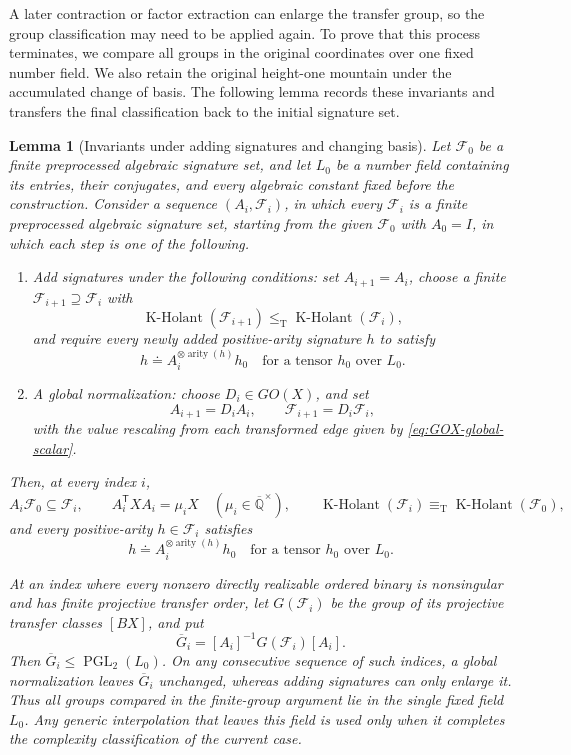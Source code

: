 \documentclass[11pt,letterpaper,onecolumn]{article}
\theoremstyle{plain}
\newtheorem{lemma}[lemma]{Lemma}
\theoremstyle{definition}
\theoremstyle{remark}
\newcommand{\AlgNums}{\overline{\mathbb Q}}
\newcommand{\cF}{\mathcal F}
\newcommand{\KHolant}{\operatorname{K\text{-}Holant}}
\newcommand{\PGL}{\operatorname{PGL}}
\newcommand{\arity}{\operatorname{arity}}
\newcommand{\leT}{\leq_{\mathrm T}}
\newcommand{\equivT}{\equiv_{\mathrm T}}
\begin{document}
	A later contraction or factor extraction can enlarge the transfer group,
so the group classification may need to be applied again. To prove that
this process terminates, we compare all groups in the original coordinates
over one fixed number field. We also retain the original height-one
mountain under the accumulated change of basis. The following lemma
records these invariants and transfers the final classification back to
the initial signature set.
\begin{lemma}[Invariants under adding signatures and changing basis]
		\label{lem:normalization-ledger}
		Let \(\cF_0\) be a finite preprocessed algebraic signature set, and let
		\(L_0\) be a
		number field containing its entries, their conjugates, and every algebraic
		constant fixed before the construction.  Consider a sequence
		\((A_i,\cF_i)\), in which every \(\cF_i\) is a finite preprocessed
		algebraic signature set, starting from the given \(\cF_0\) with
		\(A_0=I\), in which each step is one of the following.
		\begin{enumerate}
			\item Add signatures under the following conditions: set
			\(A_{i+1}=A_i\), choose a finite
			\(\cF_{i+1}\supseteq\cF_i\) with
			\[
			\KHolant(\cF_{i+1})\leT\KHolant(\cF_i),
			\]
			and require every newly added positive-arity signature \(h\) to
			satisfy
			\[
			h\doteq A_i^{\otimes\arity(h)}h_0
			\quad\text{for a tensor }h_0\text{ over }L_0.
			\]
			\item A global normalization: choose \(D_i\in GO(X)\), and set
			\[
			A_{i+1}=D_iA_i,
			\qquad
			\cF_{i+1}=D_i\cF_i,
			\]
			with the value rescaling from each transformed edge given by \cref{eq:GOX-global-scalar}.
		\end{enumerate}
		Then, at every index \(i\),
		\begin{equation}
			A_i\cF_0\subseteq\cF_i,
			\qquad
			A_i^{\mathsf T}XA_i=\mu_iX
			\quad(\mu_i\in\AlgNums^\times),
			\qquad
			\KHolant(\cF_i)\equivT\KHolant(\cF_0),
			\label{eq:normalization-ledger}
		\end{equation}
		and every positive-arity \(h\in\cF_i\) satisfies
		\[
		h\doteq A_i^{\otimes\arity(h)}h_0
		\quad\text{for a tensor }h_0\text{ over }L_0.
		\]
		
		At an index where every nonzero directly realizable ordered binary is
		nonsingular and has finite projective transfer order, let \(G(\cF_i)\)
		be the group of its projective transfer classes \([BX]\), and put
		\[
		\overline G_i=[A_i]^{-1}G(\cF_i)[A_i].
		\]
		Then \(\overline G_i\le\PGL_2(L_0)\).  On any consecutive sequence
		of such indices, a global normalization leaves \(\overline G_i\) unchanged,
		whereas adding signatures can only enlarge it.  Thus all groups compared in
		the finite-group argument lie in the single fixed field \(L_0\). Any generic
		interpolation that leaves this field is used only when it completes the
		complexity classification of the current case.
		

\end{lemma}
\end{document}
